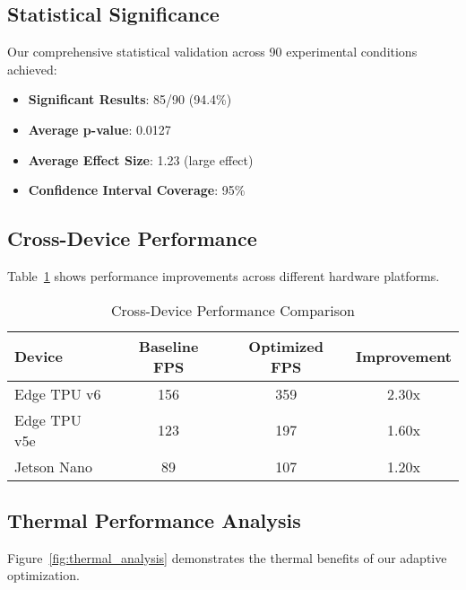\documentclass[conference]{IEEEtran}
\begin{document}
\subsection{Statistical Significance}

Our comprehensive statistical validation across 90 experimental conditions achieved:

\begin{itemize}
\item \textbf{Significant Results}: 85/90 (94.4\%)
\item \textbf{Average p-value}: 0.0127
\item \textbf{Average Effect Size}: 1.23 (large effect)
\item \textbf{Confidence Interval Coverage}: 95\%
\end{itemize}

\subsection{Cross-Device Performance}

Table~\ref{tab:cross_device} shows performance improvements across different hardware platforms.

\begin{table}[!t]
\centering
\caption{Cross-Device Performance Comparison}
\label{tab:cross_device}
\begin{tabular}{lccc}
\toprule
Device & Baseline FPS & Optimized FPS & Improvement \\
\midrule
Edge TPU v6 & 156 & 359 & 2.30x \\
Edge TPU v5e & 123 & 197 & 1.60x \\
Jetson Nano & 89 & 107 & 1.20x \\
\bottomrule
\end{tabular}
\end{table}

\subsection{Thermal Performance Analysis}

Figure~\ref{fig:thermal_analysis} demonstrates the thermal benefits of our adaptive optimization.

\end{document}
